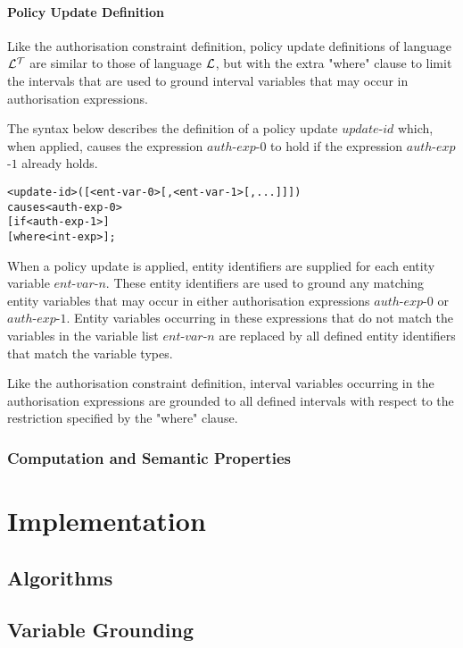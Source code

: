 \documentclass[11pt]{report}
\newenvironment{vverbatim}
{
  \begin{alltt}
}
{
  \vspace{-\baselineskip}
  \end{alltt}
}
\begin{document}
        \subsubsection{Policy Update Definition}

          Like the authorisation constraint definition, policy update
          definitions of language ${\cal L^T}$ are similar to those of language
          ${\cal L}$, but with the extra "where" clause to limit the intervals
          that are used to ground interval variables that may occur in
          authorisation expressions.

          The syntax below describes the definition of a policy update
          $update$-$id$ which, when applied, causes the expression
          $auth$-$exp$-$0$ to hold if the expression $auth$-$exp$-$1$ already
          holds.

          \begin{vverbatim}
  <update-id>([<ent-var-0>[, <ent-var-1>[, ...]]])
    causes <auth-exp-0>
    [if <auth-exp-1>]
    [where <int-exp>];
          \end{vverbatim}

          When a policy update is applied, entity identifiers are supplied for
          each entity variable $ent$-$var$-$n$. These entity identifiers are
          used to ground any matching entity variables that may occur in either
          authorisation expressions $auth$-$exp$-$0$ or $auth$-$exp$-$1$.
          Entity variables occurring in these expressions that do not match
          the variables in the variable list $ent$-$var$-$n$ are replaced by
          all defined entity identifiers that match the variable types.

          Like the authorisation constraint definition, interval variables
          occurring in the authorisation expressions are grounded to all
          defined intervals with respect to the restriction specified by the
          "where" clause.

      \subsection{Computation and Semantic Properties}

  \chapter{Implementation}

    \section{Algorithms}

    \section{Variable Grounding}
\end{document}
